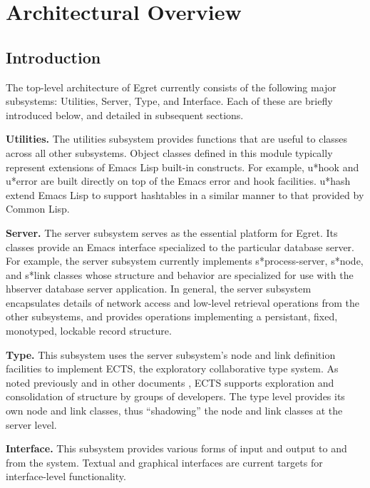 \chapter{Architectural Overview}
\section{Introduction}

The top-level architecture of Egret  currently consists of the following
major subsystems:  Utilities, Server, Type, and Interface.  Each of these
are briefly introduced below, and detailed in subsequent sections.

\begin{itemizenoindent}
  
\item {\bf Utilities.} The utilities subsystem provides functions
  that are useful to classes across all other subsystems. Object classes
defined in this
  module typically represent extensions of Emacs Lisp built-in constructs.
  For example, {\sf u*hook} and {\sf u*error} are built directly on top
  of the Emacs error and hook facilities. {\sf u*hash} extend Emacs Lisp
  to support hashtables in a similar manner to that provided by Common
  Lisp. 
  
\item {\bf Server.} The server subsystem serves as the essential platform for
Egret.
   Its classes provide an Emacs interface specialized to the particular
database server.  For example, the server subsystem currently implements
  {\sf s*process-server}, {\sf s*node}, and {\sf s*link} classes whose
  structure and behavior are specialized for use with the hbserver
  database server application.  In general, the server subsystem encapsulates
details of network access and low-level
  retrieval operations from the other subsystems, and provides
  operations implementing a persistant, fixed, monotyped, lockable
  record structure.
  
\item {\bf Type.} This subsystem uses the server subsystem's node
  and link definition facilities to implement ECTS, the exploratory
collaborative type system.  As noted previously and in other 
documents \cite{csdl-92-01},  ECTS
  supports exploration and consolidation of structure by groups of 
developers.   The type level provides its own node and link classes,
thus ``shadowing'' the node and link classes at the server level.
  
\item {\bf Interface.} This subsystem provides various forms of input
  and output to and from the system.  Textual and graphical interfaces
  are current targets for interface-level functionality.
  

\end{itemizenoindent}
